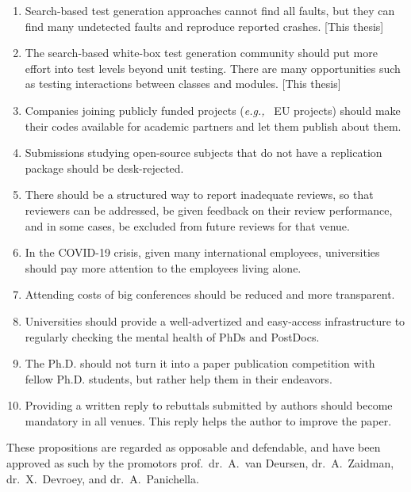 \documentclass{propositions}
\begin{document}
\begin{enumerate}
\item Search-based test generation approaches cannot find all faults, but they can find many undetected faults and reproduce reported crashes. [This thesis]
\item The search-based white-box test generation community should put more effort into test levels beyond unit testing. There are many opportunities such as testing interactions between classes and modules. [This thesis]
\item Companies joining publicly funded projects (\textit{e.g.,~} EU projects) should make their codes available for academic partners and let them publish about them.
\item Submissions studying open-source subjects that do not have a replication package should be desk-rejected.
\item There should be a structured way to report inadequate reviews, so that reviewers can be addressed, be given feedback on their review performance, and in some cases, be excluded from future reviews for that venue.
\item In the COVID-19 crisis,  given many international employees, universities should pay more attention to the employees living alone.
\item Attending costs of big conferences should be reduced and more transparent.
\item Universities should provide a well-advertized and easy-access infrastructure to regularly checking the mental health of PhDs and PostDocs. 
\item The Ph.D. should not turn it into a paper publication competition with fellow Ph.D. students, but rather help them in their endeavors. 
\item Providing a written reply to rebuttals submitted by authors should become mandatory in all venues. This reply helps the author to improve the paper.
\end{enumerate}

\bigskip

\begin{center}
These propositions are regarded as opposable and defendable, and have been approved as such by the
promotors prof.\ dr.\ A.\ van Deursen, dr.\ A.\ Zaidman, dr.\ X.\ Devroey, and dr.\ A.\ Panichella.
\end{center}
\end{document}
